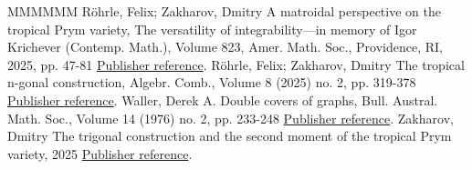 \documentclass[11pt]{article}
\theoremstyle{definition}
\numberwithin{equation}{section}
\theoremstyle{definition}
\begin{document}
\begin{thebibliography}{MMMMMM}
 Röhrle, Felix; Zakharov, Dmitry A matroidal perspective on the tropical Prym variety, The versatility of integrability—in memory of Igor Krichever (Contemp. Math.), Volume 823, Amer. Math. Soc., Providence, RI, 2025, pp. 47-81 \href{https://alco.centre-mersenne.org/articles/10.5802/alco.452/#RZ_matroidal}{Publisher reference}.
 Röhrle, Felix; Zakharov, Dmitry The tropical n-gonal construction, Algebr. Comb., Volume 8 (2025) no. 2, pp. 319-378 \href{https://alco.centre-mersenne.org/articles/10.5802/alco.452/#RZ_ngonal}{Publisher reference}.
 Waller, Derek A. Double covers of graphs, Bull. Austral. Math. Soc., Volume 14 (1976) no. 2, pp. 233-248 \href{https://alco.centre-mersenne.org/articles/10.5802/alco.452/#Waller_DoubleCoversOfGraphs}{Publisher reference}.
 Zakharov, Dmitry The trigonal construction and the second moment of the tropical Prym variety, 2025 \href{https://alco.centre-mersenne.org/articles/10.5802/alco.452/#Zakharov_Trigonal}{Publisher reference}.
\end{thebibliography}
\end{document}
